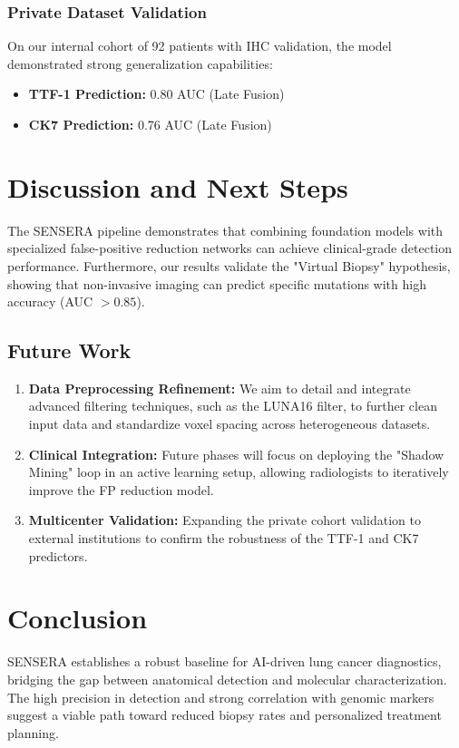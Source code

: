 \documentclass[10pt, twocolumn, letterpaper]{article}
\begin{document}
\subsubsection{Private Dataset Validation}
On our internal cohort of 92 patients with IHC validation, the model demonstrated strong generalization capabilities:
\begin{itemize}
    \item \textbf{TTF-1 Prediction:} 0.80 AUC (Late Fusion)
    \item \textbf{CK7 Prediction:} 0.76 AUC (Late Fusion)
\end{itemize}

\section{Discussion and Next Steps}
The SENSERA pipeline demonstrates that combining foundation models with specialized false-positive reduction networks can achieve clinical-grade detection performance. Furthermore, our results validate the "Virtual Biopsy" hypothesis, showing that non-invasive imaging can predict specific mutations with high accuracy (AUC $> 0.85$).

\subsection{Future Work}
\begin{enumerate}
    \item \textbf{Data Preprocessing Refinement:} We aim to detail and integrate advanced filtering techniques, such as the LUNA16 filter, to further clean input data and standardize voxel spacing across heterogeneous datasets.
    \item \textbf{Clinical Integration:} Future phases will focus on deploying the "Shadow Mining" loop in an active learning setup, allowing radiologists to iteratively improve the FP reduction model.
    \item \textbf{Multicenter Validation:} Expanding the private cohort validation to external institutions to confirm the robustness of the TTF-1 and CK7 predictors.
\end{enumerate}

\section{Conclusion}
SENSERA establishes a robust baseline for AI-driven lung cancer diagnostics, bridging the gap between anatomical detection and molecular characterization. The high precision in detection and strong correlation with genomic markers suggest a viable path toward reduced biopsy rates and personalized treatment planning.
\end{document}
